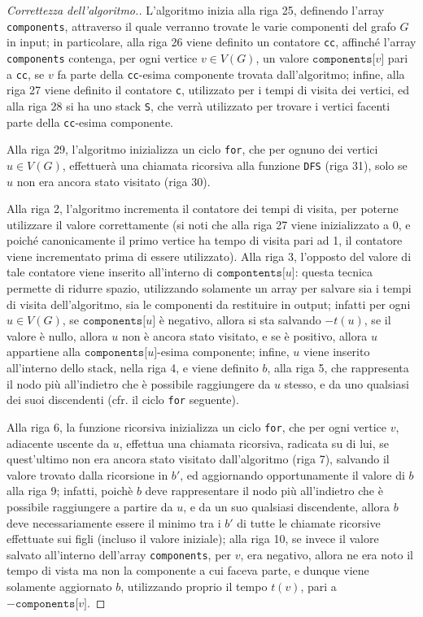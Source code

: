\documentclass[a4paper, 12pt]{report}
\begin{document}
    \begin{proof}[Correttezza dell'algoritmo.]
        L'algoritmo inizia alla riga 25, definendo l'array \texttt{components}, attraverso il quale verranno trovate le varie componenti del grafo $G$ in input; in particolare, alla riga 26 viene definito un contatore \texttt{cc}, affinché l'array \texttt{components} contenga, per ogni vertice $v \in V(G)$, un valore $\texttt{components[}v\texttt{]}$ pari a \texttt{cc}, se $v$ fa parte della \texttt{cc}-esima componente trovata dall'algoritmo; infine, alla riga 27 viene definito il contatore \texttt{c}, utilizzato per i tempi di visita dei vertici, ed alla riga 28 si ha uno stack \texttt{S}, che verrà utilizzato per trovare i vertici facenti parte della \texttt{cc}-esima componente.
        
        Alla riga 29, l'algoritmo inizializza un ciclo \texttt{for}, che per ognuno dei vertici $u \in V(G)$, effettuerà una chiamata ricorsiva alla funzione \texttt{DFS} (riga 31), solo se $u$ non era ancora stato visitato (riga 30).

        Alla riga 2, l'algoritmo incrementa il contatore dei tempi di visita, per poterne utilizzare il valore correttamente (si noti che alla riga 27 viene inizializzato a 0, e poiché canonicamente il primo vertice ha tempo di visita pari ad 1, il contatore viene incrementato prima di essere utilizzato). Alla riga 3, l'opposto del valore di tale contatore viene inserito all'interno di $\texttt{compontents[}u\texttt{]}$: questa tecnica permette di ridurre spazio, utilizzando solamente un array per salvare sia i tempi di visita dell'algoritmo, sia le componenti da restituire in output; infatti per ogni $u \in V(G)$, se $\texttt{components[}u\texttt{]}$ è negativo, allora si sta salvando $-t(u)$, se il valore è nullo, allora $u$ non è ancora stato visitato, e se è positivo, allora $u$ appartiene alla $\texttt{components[}u\texttt{]}$-esima componente; infine, $u$ viene inserito all'interno dello stack, nella riga 4, e viene definito $b$, alla riga 5, che rappresenta il nodo più all'indietro che è possibile raggiungere da $u$ stesso, e da uno qualsiasi dei suoi discendenti (cfr. il ciclo \texttt{for} seguente).

        Alla riga 6, la funzione ricorsiva inizializza un ciclo \texttt{for}, che per ogni vertice $v$, adiacente uscente da $u$, effettua una chiamata ricorsiva, radicata su di lui, se quest'ultimo non era ancora stato visitato dall'algoritmo (riga 7), salvando il valore trovato dalla ricorsione in $b'$, ed aggiornando opportunamente il valore di $b$ alla riga 9; infatti, poichè $b$ deve rappresentare il nodo più all'indietro che è possibile raggiungere a partire da $u$, e da un suo qualsiasi discendente, allora $b$ deve necessariamente essere il minimo tra i $b'$ di tutte le chiamate ricorsive effettuate sui figli (incluso il valore iniziale); alla riga 10, se invece il valore salvato all'interno dell'array \texttt{components}, per $v$, era negativo, allora ne era noto il tempo di vista ma non la componente a cui faceva parte, e dunque viene solamente aggiornato $b$, utilizzando proprio il tempo $t(v)$, pari a $-\texttt{components[}v\texttt{]}$.


\end{proof}
\end{document}
